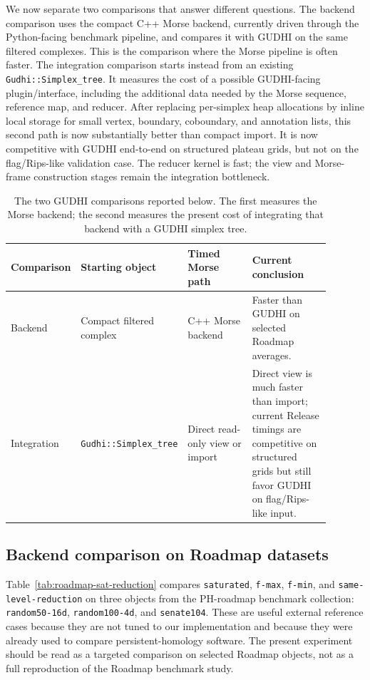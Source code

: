\documentclass[11pt]{article}
\begin{document}
We now separate two comparisons that answer different questions.  The backend comparison
uses the compact C++ Morse backend, currently driven through the Python-facing benchmark
pipeline, and compares it with GUDHI on the same filtered complexes.  This is the comparison
where the Morse pipeline is often faster.  The integration comparison starts instead from
an existing \texttt{Gudhi::Simplex\_tree}.  It measures the cost of a possible GUDHI-facing
plugin/interface, including the additional data needed by the Morse sequence, reference map,
and reducer.  After replacing per-simplex heap allocations by inline local storage for
small vertex, boundary, coboundary, and annotation lists, this second path is now
substantially better than compact import.  It is now competitive with GUDHI end-to-end on
structured plateau grids, but not on the flag/Rips-like validation case.  The reducer
kernel is fast; the view and Morse-frame construction stages remain the integration
bottleneck.

\begin{table}[ht]
\centering
\small
\setlength{\tabcolsep}{3pt}
\begin{tabular}{p{0.16\linewidth}p{0.23\linewidth}p{0.23\linewidth}p{0.27\linewidth}}
\toprule
Comparison & Starting object & Timed Morse path & Current conclusion \\
\midrule
Backend & Compact filtered complex & C++ Morse backend & Faster than GUDHI on selected Roadmap averages. \\
Integration & \texttt{Gudhi::Simplex\_tree} & Direct read-only view or import & Direct view is much faster than import; current Release timings are competitive on structured grids but still favor GUDHI on flag/Rips-like input. \\
\bottomrule
\end{tabular}
\caption{The two GUDHI comparisons reported below.  The first measures the Morse backend;
the second measures the present cost of integrating that backend with a GUDHI simplex tree.}
\label{tab:gudhi-comparison-map}
\end{table}

\subsection{Backend comparison on Roadmap datasets}

Table~\ref{tab:roadmap-sat-reduction} compares \texttt{saturated}, \texttt{f-max},
\texttt{f-min}, and \texttt{same-level-reduction} on three objects from the
PH-roadmap benchmark collection:
\texttt{random50-16d}, \texttt{random100-4d}, and \texttt{senate104}.  These are useful
external reference cases because they are not tuned to our implementation and because they
were already used to compare persistent-homology software.  The present experiment should
be read as a targeted comparison on selected Roadmap objects, not as a full reproduction of
the Roadmap benchmark study.
\end{document}
